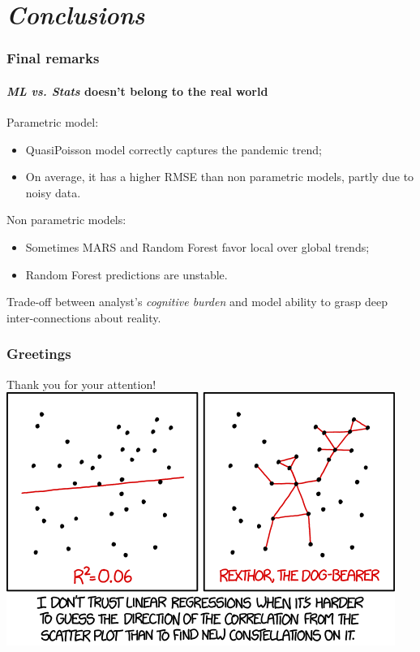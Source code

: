 \documentclass{beamer}
\begin{document}
\section{\textit{Conclusions}}{
	\begin{frame}
		\frametitle{Final remarks}
		\framesubtitle{\textit{ML vs. Stats} doesn't belong to the real world}
		\hfill \break
		Parametric model:
		\begin{itemize}
			\item{QuasiPoisson model correctly captures the pandemic trend;}
			\item{On average, it has a higher RMSE than non parametric models, partly due to noisy data.}
		\end{itemize}
		\hfill \break
		Non parametric models:
		\begin{itemize}
			\item{Sometimes MARS and Random Forest favor local over global trends;}
			\item{Random Forest predictions are unstable.}
		\end{itemize}
		\hfill \break
		Trade-off between analyst's \textit{cognitive burden} and model ability to grasp deep inter-connections about reality.

	\end{frame}

}

\begin{frame}
	\frametitle{Greetings}
		\center Thank you for your attention!
		\center \includegraphics[scale = 0.5]{rexthor.png}
\end{frame}

\end{document}
